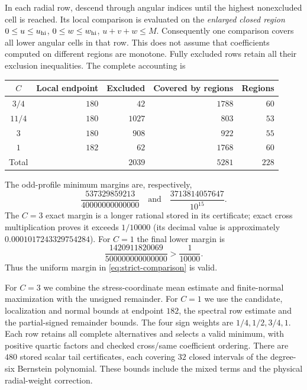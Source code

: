 In each radial row, descend through angular indices until the highest
nonexcluded cell is reached. Its local comparison is evaluated on the
\emph{enlarged closed region}
$0\le u\le u_{\rm hi}$, $0\le w\le w_{\rm hi}$, $u+v+w\le M$.
Consequently one comparison covers all lower angular cells in that
row. This does not assume that coefficients computed on different
regions are monotone. Fully excluded rows retain all their exclusion
inequalities. The complete accounting is
\begin{center}
\begin{tabular}{crrrr}
\toprule
$C$ & Local endpoint & Excluded & Covered by regions & Regions\\
\midrule
$3/4$ & $180$ & $42$ & $1788$ & $60$\\
$11/4$ & $180$ & $1027$ & $803$ & $53$\\
$3$ & $180$ & $908$ & $922$ & $55$\\
$1$ & $182$ & $62$ & $1768$ & $60$\\
\midrule
Total && $2039$ & $5281$ & $228$\\
\bottomrule
\end{tabular}
\end{center}

The odd-profile minimum margins are, respectively,
\[
 \frac{537329859213}{40000000000000}\quad\text{and}\quad
 \frac{3713814057647}{10^{15}}.
\]
The $C=3$ exact margin is a longer rational
stored in its certificate; exact cross multiplication proves it exceeds
$1/10000$ (its decimal value is approximately $0.0001017243329754284$).
For $C=1$ the final lower margin is
\[
 \frac{1420911820069}{500000000000000}>\frac1{10000}.
\]
Thus the uniform margin in \eqref{eq:strict-comparison} is valid.

For $C=3$ we combine the stress-coordinate mean estimate and
finite-normal maximization with the unsigned remainder. For $C=1$ we
use the candidate, localization and normal bounds at endpoint $182$,
the spectral row estimate and the partial-signed remainder bounds.
The four sign weights are $1/4,1/2,3/4,1$. Each row retains all
complete alternatives and selects a valid minimum, with positive
quartic factors and checked cross/same coefficient ordering. There are
$480$ stored scalar tail certificates, each covering $32$ closed
intervals of the degree-six Bernstein polynomial. These bounds include
the mixed terms and the physical radial-weight correction.

